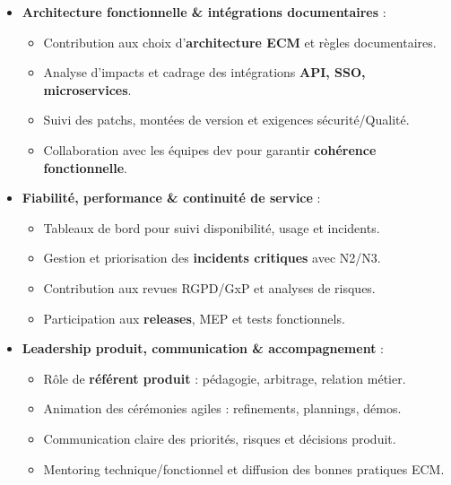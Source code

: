 \begin{experiences}
{\begin{itemize}[left=0pt,label={},itemsep=0.5em]
          \vspace{0.3em}
          \item \textbf{Architecture fonctionnelle \& intégrations documentaires} :
            \begin{itemize}[itemsep=0.2em,topsep=0.2em,parsep=0pt]
              \small
              \item Contribution aux choix d’\textbf{architecture ECM} et règles documentaires.
              \item Analyse d’impacts et cadrage des intégrations \textbf{API, SSO, microservices}.
              \item Suivi des patchs, montées de version et exigences sécurité/Qualité.
              \item Collaboration avec les équipes dev pour garantir \textbf{cohérence fonctionnelle}.
            \end{itemize}
          \vspace{0.3em}
          \item \textbf{Fiabilité, performance \& continuité de service} :
            \begin{itemize}[itemsep=0.2em,topsep=0.2em,parsep=0pt]
              \small
              \item Tableaux de bord pour suivi disponibilité, usage et incidents.
              \item Gestion et priorisation des \textbf{incidents critiques} avec N2/N3.
              \item Contribution aux revues RGPD/GxP et analyses de risques.
              \item Participation aux \textbf{releases}, MEP et tests fonctionnels.
            \end{itemize}

          \vspace{0.3em}
          \item \textbf{Leadership produit, communication \& accompagnement} :
            \begin{itemize}[itemsep=0.2em,topsep=0.2em,parsep=0pt]
              \small
              \item Rôle de \textbf{référent produit} : pédagogie, arbitrage, relation métier.
              \item Animation des cérémonies agiles : refinements, plannings, démos.
              \item Communication claire des priorités, risques et décisions produit.
              \item Mentoring technique/fonctionnel et diffusion des bonnes pratiques ECM.
            \end{itemize}


\end{itemize}}
\end{experiences}

